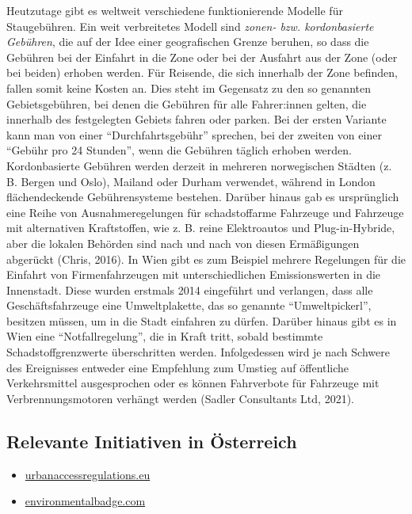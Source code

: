 \documentclass[
]{book}
\providecommand{\tightlist}{%
  \setlength{\itemsep}{0pt}\setlength{\parskip}{0pt}}
\begin{document}
Heutzutage gibt es weltweit verschiedene funktionierende Modelle für Staugebühren. Ein weit verbreitetes Modell sind \emph{zonen- bzw. kordonbasierte Gebühren}, die auf der Idee einer geografischen Grenze beruhen, so dass die Gebühren bei der Einfahrt in die Zone oder bei der Ausfahrt aus der Zone (oder bei beiden) erhoben werden. Für Reisende, die sich innerhalb der Zone befinden, fallen somit keine Kosten an. Dies steht im Gegensatz zu den so genannten Gebietsgebühren, bei denen die Gebühren für alle Fahrer:innen gelten, die innerhalb des festgelegten Gebiets fahren oder parken. Bei der ersten Variante kann man von einer ``Durchfahrtsgebühr'' sprechen, bei der zweiten von einer ``Gebühr pro 24 Stunden'', wenn die Gebühren täglich erhoben werden. Kordonbasierte Gebühren werden derzeit in mehreren norwegischen Städten (z. B. Bergen und Oslo), Mailand oder Durham verwendet, während in London flächendeckende Gebührensysteme bestehen.
Darüber hinaus gab es ursprünglich eine Reihe von Ausnahmeregelungen für schadstoffarme Fahrzeuge und Fahrzeuge mit alternativen Kraftstoffen, wie z. B. reine Elektroautos und Plug-in-Hybride, aber die lokalen Behörden sind nach und nach von diesen Ermäßigungen abgerückt (Chris, 2016). In Wien gibt es zum Beispiel mehrere Regelungen für die Einfahrt von Firmenfahrzeugen mit unterschiedlichen Emissionswerten in die Innenstadt. Diese wurden erstmals 2014 eingeführt und verlangen, dass alle Geschäftsfahrzeuge eine Umweltplakette, das so genannte ``Umweltpickerl'', besitzen müssen, um in die Stadt einfahren zu dürfen. Darüber hinaus gibt es in Wien eine ``Notfallregelung'', die in Kraft tritt, sobald bestimmte Schadstoffgrenzwerte überschritten werden. Infolgedessen wird je nach Schwere des Ereignisses entweder eine Empfehlung zum Umstieg auf öffentliche Verkehrsmittel ausgesprochen oder es können Fahrverbote für Fahrzeuge mit Verbrennungsmotoren verhängt werden (Sadler Consultants Ltd, 2021).

\hypertarget{relevante-initiativen-in-uxf6sterreich-9}{%
\subsection*{Relevante Initiativen in Österreich}\label{relevante-initiativen-in-uxf6sterreich-9}}

\begin{itemize}
\tightlist
\item
  \href{https://urbanaccessregulations.eu/countries-mainmenu-147/austria-mainmenu-78/wien-vienna}{urbanaccessregulations.eu}
\item
  \href{https://www.environmentalbadge.com/environmental-zone-vienna/}{environmentalbadge.com}
\end{itemize}
\end{document}
